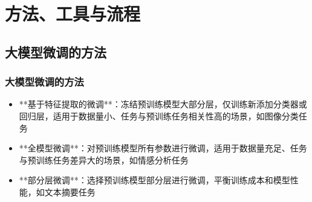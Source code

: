 \section{方法、工具与流程}
\subsection{大模型微调的方法}
\begin{frame}
    \frametitle{大模型微调的方法}
    \begin{itemize}
        \item **基于特征提取的微调**：冻结预训练模型大部分层，仅训练新添加分类器或回归层，适用于数据量小、任务与预训练任务相关性高的场景，如图像分类任务
        \item **全模型微调**：对预训练模型所有参数进行微调，适用于数据量充足、任务与预训练任务差异大的场景，如情感分析任务
        \item **部分层微调**：选择预训练模型部分层进行微调，平衡训练成本和模型性能，如文本摘要任务
    \end{itemize}
\end{frame}

